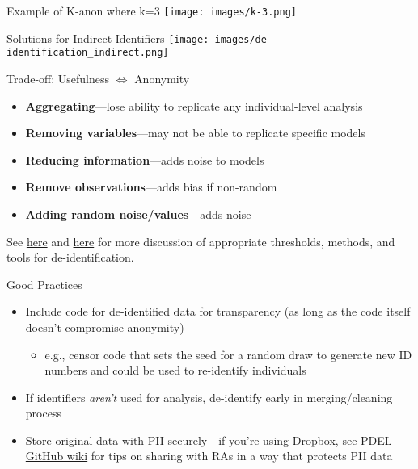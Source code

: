 \documentclass[12pt, compress]{beamer} %
\let\olditem\item %
\renewcommand{\item}{%
\olditem\vspace{\fill}}
\begin{document}
	\begin{frame}{Example of K-anon where k=3}
			 \centering \texttt{[image: images/k-3.png]}
	\end{frame}
	
	\begin{frame}{Solutions for Indirect Identifiers}
		\centering \texttt{[image: images/de-identification\_indirect.png]}
	\end{frame}
	
	\begin{frame}{Trade-off: \textcolor{burntorange}{Usefulness} $\Longleftrightarrow$ \textcolor{burntorange}{Anonymity}}
		
		\begin{itemize}
			\item \textbf{Aggregating}---lose ability to replicate any individual-level analysis
			\item \textbf{Removing variables}---may not be able to replicate specific models
			\item \textbf{Reducing information}---adds noise to models
			\item \textbf{Remove observations}---adds bias if non-random
			\item \textbf{Adding random noise/values}---adds noise
		\end{itemize}	
	
	
	\bigskip
			See \href{http://www.ehealthinformation.ca/wp-content/uploads/2014/08/2010-Risk-based-de-identification-of-health-data.pdf}{here} and \href{http://www.ehealthinformation.ca/wp-content/uploads/2014/08/2009-Tools-for-De-Identification-of-Personal-Health.pdf}{here} for more discussion of appropriate thresholds, methods, and tools for de-identification.

	\end{frame}
	
	\begin{frame}{Good Practices}
			\begin{itemize}
				\item Include code for de-identified data for transparency (as long as the code itself doesn't compromise anonymity) 
					\begin{itemize}
						\item e.g., censor code that sets the seed for a random draw to generate new ID numbers and could be used to re-identify individuals
					\end{itemize}
				\item If identifiers \textit{aren't} used for analysis, de-identify early in merging/cleaning process
				\item Store original data with PII securely---if you're using Dropbox, see \href{https://github.com/PolicyDesignEvaluationLab/Transparency-Initiative/wiki/Tips:-Protocol-for-Sharing-Data-via-Dropbox}{PDEL GitHub wiki} for tips on sharing with RAs in a way that protects PII data
			\end{itemize} 	
	\end{frame}
\end{document}
